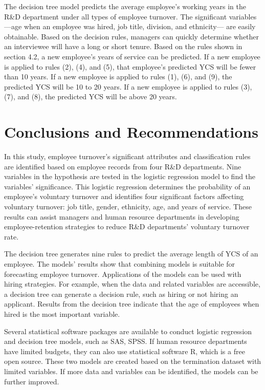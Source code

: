 The decision tree model predicts the average employee’s working years in the R\&D department under all types of employee turnover. The significant variables—age when an employee was hired, job title, division, and ethnicity— are easily obtainable. Based on the decision rules, managers can quickly determine whether an interviewee will have a long or short tenure. Based on the rules shown in section 4.2, a new employee’s years of service can be predicted. If a new employee is applied to rules (2), (4), and (5), that employee’s predicted YCS will be fewer than 10 years. If a new employee is applied to rules (1), (6), and (9), the predicted YCS will be 10 to 20 years. If a new employee is applied to rules (3), (7), and (8), the predicted YCS will be above 20 years.
\section{Conclusions and Recommendations}
In this study, employee turnover’s significant attributes and classification rules are identified based on employee records from four R\&D departments. Nine variables in the hypothesis are tested in the logistic regression model to find the variables’ significance. This logistic regression determines the probability of an employee's voluntary turnover and identifies four significant factors affecting voluntary turnover: job title, gender, ethnicity, age, and years of service. These results can assist managers and human resource departments in developing employee-retention strategies to reduce R\&D departments’ voluntary turnover rate.  
 
The decision tree generates nine rules to predict the average length of YCS of an employee. The models’ results show that combining models is suitable for forecasting employee turnover. Applications of the models can be used with hiring strategies. For example, when the data and related variables are accessible, a decision tree can generate a decision rule, such as hiring or not hiring an applicant. Results from the decision tree indicate that the age of employees when hired is the most important variable. 

Several statistical software packages are available to conduct logistic regression and decision tree models, such as SAS, SPSS. If human resource departments have limited budgets, they can also use statistical software R, which is a free open source. These two models are created based on the termination dataset with limited variables. If more data and variables can be identified, the models can be further improved. 



